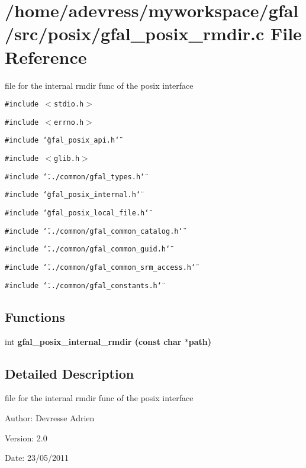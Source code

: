 \section{/home/adevress/myworkspace/gfal/src/posix/gfal\_\-posix\_\-rmdir.c File Reference}
\label{gfal__posix__rmdir_8c}
file for the internal rmdir func of the posix interface 

{\tt \#include $<$stdio.h$>$}\par
{\tt \#include $<$errno.h$>$}\par
{\tt \#include \char`\"{}gfal\_\-posix\_\-api.h\char`\"{}}\par
{\tt \#include $<$glib.h$>$}\par
{\tt \#include \char`\"{}../common/gfal\_\-types.h\char`\"{}}\par
{\tt \#include \char`\"{}gfal\_\-posix\_\-internal.h\char`\"{}}\par
{\tt \#include \char`\"{}gfal\_\-posix\_\-local\_\-file.h\char`\"{}}\par
{\tt \#include \char`\"{}../common/gfal\_\-common\_\-catalog.h\char`\"{}}\par
{\tt \#include \char`\"{}../common/gfal\_\-common\_\-guid.h\char`\"{}}\par
{\tt \#include \char`\"{}../common/gfal\_\-common\_\-srm\_\-access.h\char`\"{}}\par
{\tt \#include \char`\"{}../common/gfal\_\-constants.h\char`\"{}}\par
\subsection*{Functions}
\begin{CompactItemize}
\item 
int \bf{gfal\_\-posix\_\-internal\_\-rmdir} (const char $\ast$path)
\end{CompactItemize}


\subsection{Detailed Description}
file for the internal rmdir func of the posix interface 

\begin{Desc}
\item[Author:]Devresse Adrien \end{Desc}
\begin{Desc}
\item[Version:]2.0 \end{Desc}
\begin{Desc}
\item[Date:]23/05/2011 \end{Desc}


